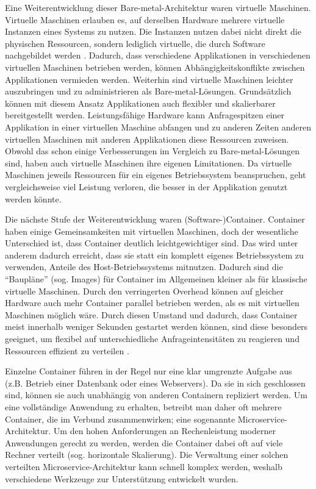 \documentclass[11pt,a4paper]{article}
\begin{document}
Eine Weiterentwicklung dieser Bare-metal-Architektur waren virtuelle Maschinen. Virtuelle Maschinen erlauben es, auf derselben Hardware mehrere virtuelle Instanzen eines
Systems zu nutzen. Die Instanzen nutzen dabei nicht direkt die physischen Ressourcen, sondern lediglich virtuelle, die durch Software nachgebildet werden \cite{kofler2021docker}.
Dadurch, dass verschiedene Applikationen in verschiedenen virtuellen Maschinen betrieben werden, können Abhängigkeitskonflikte zwischen Applikationen
vermieden werden. Weiterhin sind virtuelle Maschinen leichter auszubringen und zu administrieren als Bare-metal-Lösungen.
Grundsätzlich können mit diesem Ansatz Applikationen auch flexibler und skalierbarer bereitgestellt werden.
Leistungsfähige Hardware kann Anfragespitzen einer Applikation in einer virtuellen Maschine abfangen und zu anderen Zeiten anderen virtuellen Maschinen mit anderen
Applikationen diese Ressourcen zuweisen.
Obwohl das schon einige Verbesserungen im Vergleich zu Bare-metal-Lösungen sind, haben auch virtuelle Maschinen ihre eigenen Limitationen.
Da virtuelle Maschinen jeweils Ressourcen für ein eigenes Betriebssystem beanspruchen, geht vergleichsweise viel Leistung verloren, 
die besser in der Applikation genutzt werden könnte.

Die nächste Stufe der Weiterentwicklung waren (Software-)Container. Container haben einige Gemeinsamkeiten mit virtuellen Maschinen, doch der wesentliche Unterschied ist,
dass Container deutlich leichtgewichtiger sind. Das wird unter anderem dadurch erreicht, dass sie statt ein komplett eigenes Betriebssystem zu verwenden, 
Anteile des Host-Betriebssystems mitnutzen. Dadurch sind die ``Baupläne'' (sog. Images) für Container im Allgemeinen kleiner als für klassische virtuelle Maschinen.
Durch den verringerten Overhead können auf gleicher Hardware auch mehr Container parallel betrieben werden, als es mit virtuellen Maschinen möglich wäre.
Durch diesen Umstand und dadurch, dass Container meist innerhalb weniger Sekunden gestartet werden können, sind diese besonders geeignet,
um flexibel auf unterschiedliche Anfrageintensitäten zu reagieren und Ressourcen effizient zu verteilen \cite{kofler2021docker}.

Einzelne Container führen in der Regel nur eine klar umgrenzte Aufgabe aus (z.B. Betrieb einer Datenbank oder eines Webservers). Da sie in sich geschlossen sind,
können sie auch unabhängig von anderen Containern repliziert werden. Um eine vollständige Anwendung zu erhalten, betreibt man daher oft mehrere Container,
die im Verbund zusammenwirken; eine sogenannte Microservice-Architektur. Um den hohen Anforderungen an Rechenleistung moderner Anwendungen gerecht zu werden,
werden die Container dabei oft auf viele Rechner verteilt (sog. horizontale Skalierung). %
Die Verwaltung einer solchen verteilten Microservice-Architektur kann schnell komplex werden, weshalb verschiedene Werkzeuge zur Unterstützung entwickelt wurden.
\end{document}
